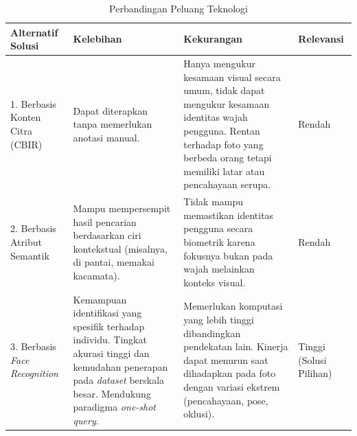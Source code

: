 \begin{table}[h]
	\caption{Perbandingan Peluang Teknologi}
\label{tab:alternatif_solusi}
\begin{tabular}{ | p{2cm} | p{4cm} | p{4cm} | p{2cm} | }
    \hline
    \textbf{Alternatif Solusi} & \textbf{Kelebihan} & \textbf{Kekurangan} & \textbf{Relevansi} \\ \hline
    
    1. Berbasis Konten Citra (CBIR) 
    & Dapat diterapkan tanpa memerlukan anotasi manual. 
    & Hanya mengukur kesamaan visual secara umum, tidak dapat mengukur kesamaan identitas wajah pengguna. Rentan terhadap foto yang berbeda orang tetapi memiliki latar atau pencahayaan serupa. 
    & Rendah \\ \hline
    
    2. Berbasis Atribut Semantik 
    & Mampu mempersempit hasil pencarian berdasarkan ciri kontekstual (misalnya, di pantai, memakai kacamata). 
    & Tidak mampu memastikan identitas pengguna secara biometrik karena fokusnya bukan pada wajah melainkan konteks visual. 
    & Rendah \\ \hline
    
    3. Berbasis \textit{Face Recognition}
    & Kemampuan identifikasi yang spesifik terhadap individu. Tingkat akurasi tinggi dan kemudahan penerapan pada \textit{dataset} berskala besar. Mendukung paradigma \textit{one-shot query}. 
    & Memerlukan komputasi yang lebih tinggi dibandingkan pendekatan lain. Kinerja dapat menurun saat dihadapkan pada foto dengan variasi ekstrem (pencahayaan, pose, oklusi). 
    & Tinggi (Solusi Pilihan) \\ \hline

  \end{tabular}
\end{table}